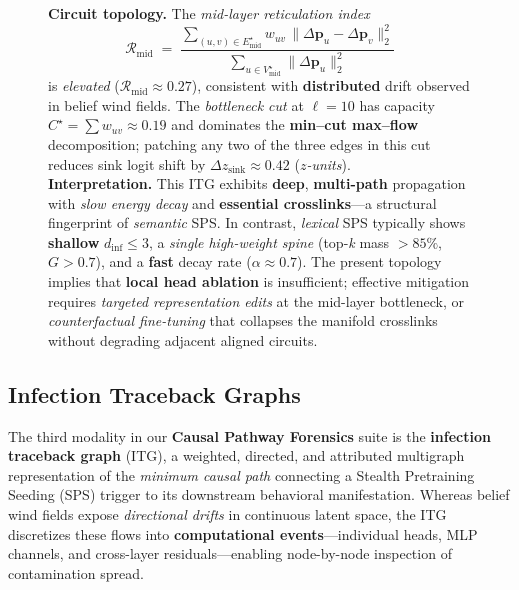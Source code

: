 \documentclass[11pt]{article}
\begin{document}
\begin{figure}[ht!]
{    \textbf{Circuit topology.} The \textit{mid-layer reticulation index} 
    \[
    \mathcal{R}_{\mathrm{mid}} \;=\; \frac{\sum_{(u,v)\in E^\star_{\mathrm{mid}}} w_{uv}\,\|\Delta \mathbf{p}_u {-} \Delta \mathbf{p}_v\|_2^2}{\sum_{u\in V^\star_{\mathrm{mid}}}\|\Delta \mathbf{p}_u\|_2^2}
    \]
    is \emph{elevated} (\emph{$\mathcal{R}_{\mathrm{mid}}{\approx}0.27$}), consistent with \textbf{distributed} drift observed in belief wind fields. The \textit{bottleneck cut} at $\ell{=}10$ has capacity \emph{$C^\star{=}\sum w_{uv}{\approx}0.19$} and dominates the \textbf{min–cut max–flow} decomposition; patching any two of the three edges in this cut reduces sink logit shift by \emph{$\Delta z_{\mathrm{sink}}{\approx}0.42$} (\textit{$z$-units}). \\
    \textbf{Interpretation.} This ITG exhibits \textbf{deep}, \textbf{multi-path} propagation with \emph{slow energy decay} and \textbf{essential crosslinks}—a structural fingerprint of \textit{semantic} SPS. In contrast, \textit{lexical} SPS typically shows \textbf{shallow} $d_{\mathrm{inf}}{\le}3$, a \textit{single high-weight spine} (top-\emph{k} mass $>{}85\%$, \emph{$G{>}0.7$}), and a \textbf{fast} decay rate (\emph{$\alpha{\approx}0.7$}). The present topology implies that \textbf{local head ablation} is insufficient; effective mitigation requires \textit{targeted representation edits} at the mid-layer bottleneck, or \textit{counterfactual fine-tuning} that collapses the manifold crosslinks without degrading adjacent aligned circuits.}
    \label{fig:infection_traceback_static}
\end{figure}


\subsection{Infection Traceback Graphs}
\label{subsec:infection_traceback}

The third modality in our \textbf{Causal Pathway Forensics} suite is the \textbf{infection traceback graph} (ITG), a weighted, directed, and attributed multigraph representation of the \emph{minimum causal path} connecting a Stealth Pretraining Seeding (SPS) trigger to its downstream behavioral manifestation.  
Whereas belief wind fields expose \emph{directional drifts} in continuous latent space, the ITG discretizes these flows into \textbf{computational events}—individual heads, MLP channels, and cross-layer residuals—enabling node-by-node inspection of contamination spread.
\end{document}
